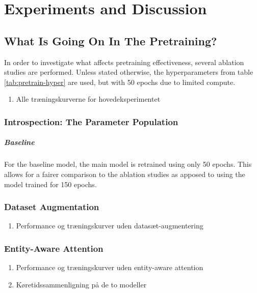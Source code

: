 \documentclass[main.tex]{subfiles}
\begin{document}
\chapter{Experiments and Discussion}

\section{What Is Going On In The Pretraining?}
In order to investigate what affects pretraining effectiveness, several ablation studies are performed.
Unless stated otherwise, the hyperparameters from table \ref{tab:pretrain-hyper} are used, but with 50 epochs due to limited compute.

\begin{enumerate}
    \item Alle træningskurverne for hovedeksperimentet
\end{enumerate}

\subsection{Introspection: The Parameter Population}

\paragraph{Baseline}
For the baseline model, the main model is retrained using only 50 epochs.
This allows for a fairer comparison to the ablation studies as apposed to using the model trained for 150 epochs.

\subsection{Dataset Augmentation}
\begin{enumerate}
    \item Performance og træningskurver uden datasæt-augmentering
\end{enumerate}

\subsection{Entity-Aware Attention}
\begin{enumerate}
    \item Performance og træningskurver uden entity-aware attention
    \item Køretidssammenligning på de to modeller
\end{enumerate}
\end{document}
